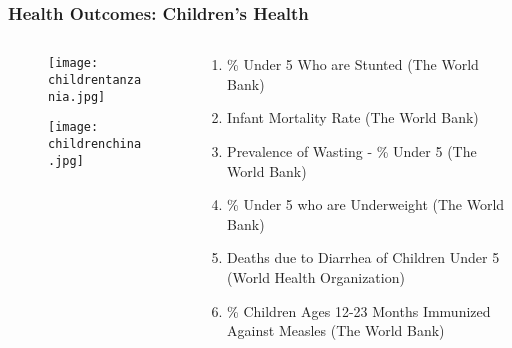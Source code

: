 \documentclass{beamer}
\begin{document}
\begin{frame}
\frametitle{Health Outcomes: Children's Health}
\begin{columns}
	\begin{column}{0.38\textwidth}
		\vspace{-1em}
		\begin{figure}
\texttt{[image: childrentanzania.jpg]}
\end{figure}
\vspace{-2em}
		\begin{figure}
\texttt{[image: childrenchina.jpg]}
\end{figure}
	\end{column}
	\begin{column}{0.58\textwidth}
	\footnotesize
\begin{enumerate}
\item \% Under 5 Who are Stunted (The World Bank)
\item Infant Mortality Rate (The World Bank)
\item Prevalence of Wasting - \% Under 5 (The World Bank)
\item \% Under 5 who are Underweight (The World Bank)
\item Deaths due to Diarrhea of Children Under 5 (World Health Organization)
\item \% Children Ages 12-23 Months Immunized Against Measles (The World Bank)
\end{enumerate}
	\end{column}
\end{columns}
\end{frame}
\end{document}
